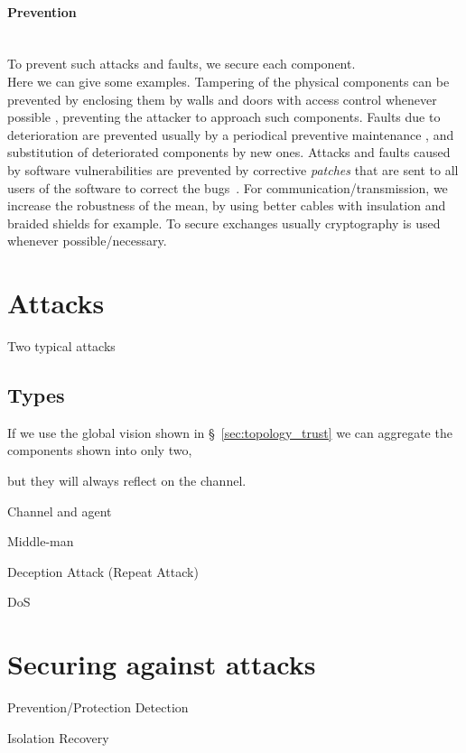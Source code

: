 \documentclass[../main.tex]{subfiles}
\begin{document}
\paragraph{Prevention}
~\\To prevent such attacks and faults, we secure each component.
\\Here we can give some examples.
Tampering of the physical components can be prevented by enclosing them by walls and doors with access control whenever possible , preventing the attacker to approach such components.
Faults due to deterioration are prevented usually by a periodical preventive maintenance , and substitution of deteriorated components by new ones.
Attacks and faults caused by software vulnerabilities are prevented by corrective \emph{patches} that are sent to all users of the software to correct the bugs~.
For communication/transmission, we increase the robustness of the mean, by using better cables with insulation and braided shields for example.
To secure exchanges usually cryptography is used whenever possible/necessary.

\section{Attacks}\label{sec:attacks}


\cite{CaiEtAl2019}
Two typical attacks \cite{ZhangEtAl2021a}

\subsection{Types}\label{sec:types_of_attacks}
If we use the global vision shown in \S~\ref{sec:topology_trust} we can aggregate the components shown into only two,
\cite{PasqualettiEtAl2013}
\cite{BoemEtAl2020}

but they will always reflect on the channel.


Channel and agent

Middle-man

Deception Attack (Repeat Attack)

DoS

\cite{GuEtAl2016}
\section{Securing against attacks}
Prevention/Protection
Detection

Isolation
Recovery
\end{document}
